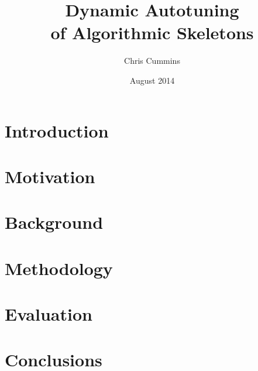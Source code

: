 
\author{Chris Cummins}

\date{August 2014}

\title{Dynamic Autotuning\\of Algorithmic Skeletons}

\newcommand{\subtitle}{MSc by Research Thesis}

\newcommand{\degreeTitle}{MSc by Research\\ Pervasive Parallelism}

\newcommand{\institution}{School of Informatics,\\
  The University of Edinburgh}



\section{Introduction}\label{sec:introduction}

\section{Motivation}\label{sec:motivation}

\section{Background}\label{sec:background}

\section{Methodology}\label{sec:methodology}

\section{Evaluation}\label{sec:evaluation}

\section{Conclusions}\label{sec:conclusions}


